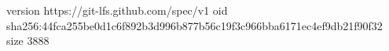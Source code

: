 version https://git-lfs.github.com/spec/v1
oid sha256:44fca255be0d1c6f892b3d996b877b56c19f3c966bba6171ec4ef9db21f90f32
size 3888
